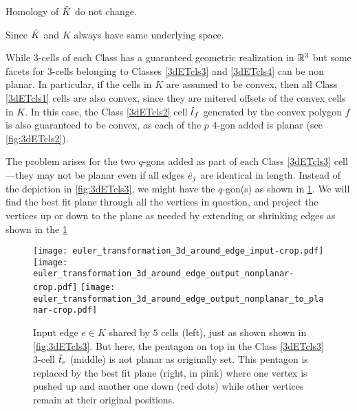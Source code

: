 \begin{prop}
	\label{prop:transcomplex}
	Homology of $\hat{K}$ do not change.
\end{prop}
Since $\hat{K}$ and $K$ always have same underlying space.
\begin{rem}
  \label{rem:nonplnr3d}
  {\rm
  	While $3$-cells of each Class has a guaranteed geometric realization in ${\mathbb R}^3$ but some facets for $3$-cells belonging to Classes \ref{3dETcls3} and \ref{3dETcls4} can be non planar.
    In particular, if the cells in $K$ are assumed to be convex, then all Class \ref{3dETcls1} cells are also convex, since they are mitered offsets of the convex cells in $K$.
    In this case, the Class \ref{3dETcls2} cell $\hat{t}_f$ generated by the convex polygon $f$ is also guaranteed to be convex, as each of the $p$ $4$-gon added is planar (see \cref{fig:3dETcls2}).
    
    The problem arises for the two $q$-gons added as part of each Class \ref{3dETcls3} cell---they may not be planar even if all edges $\hat{e}_j$ are identical in length.
    Instead of the depiction in \cref{fig:3dETcls3}, we might have the $q$-gon(s) as shown in \cref{fig:3dETcls3nplr}.
    We will find the best fit plane through all the vertices in question, and project the vertices up or down to the plane as needed by extending or shrinking edges as shown in the \cref{fig:3dETcls3nplr}
    \begin{figure}[htp!]
      \centering
      \texttt{[image: euler\_transformation\_3d\_around\_edge\_input-crop.pdf]}
      \hspace*{0.1in}
      \texttt{[image: euler\_transformation\_3d\_around\_edge\_output\_nonplanar-crop.pdf]}
      \hspace*{0.1in}
      \texttt{[image: euler\_transformation\_3d\_around\_edge\_output\_nonplanar\_to\_planar-crop.pdf]}
      \caption{
        Input edge $e \in K$ shared by $5$ cells (left), just as shown shown in \cref{fig:3dETcls3}.
        But here, the pentagon on top in the Class \ref{3dETcls3} $3$-cell $\hat{t}_e$ (middle) is not planar as originally set.
        This pentagon is replaced by the best fit plane (right, in pink) where one vertex is pushed up and another one down (red dots) while other vertices remain at their original positions. 
      }
      \label{fig:3dETcls3nplr}
    \end{figure}
    
}
\end{rem}
